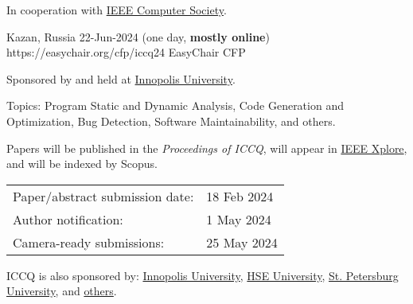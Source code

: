 \documentclass{../cfp}
\begin{document}
\PrintLogo{}



In cooperation
with
\href{https://conferences.ieee.org/conferences_events/conferences/conferencedetails/53703}{IEEE Computer Society}.

\vspace{6pt}

\PrintAddress
  {Kazan, Russia}
  {22-Jun-2024 (one day, \textbf{mostly online})}
  {https://easychair.org/cfp/iccq24}
  {EasyChair CFP}

\vspace{12pt}
%
%
\vspace{12pt}

Sponsored by and held at \href{https://innopolis.university/}{Innopolis University}.

Topics: Program Static and Dynamic Analysis,
Code Generation and Optimization,
Bug Detection, Software Maintainability, and others.

Papers will be published in the \textit{Proceedings of ICCQ},
will appear in \href{https://ieeexplore.ieee.org/Xplore/home.jsp}{IEEE Xplore\textsuperscript{\textregistered}},
and will be indexed by Scopus.

\begin{tabular}{@{}ll}
Paper/abstract submission date: & 18 Feb 2024 \\
Author notification: & 1 May 2024 \\
Camera-ready submissions: & 25 May 2024
\end{tabular}

\vspace{6pt}
ICCQ is also sponsored by:
\href{https://innopolis.university/}{Innopolis University},
\href{https://www.hse.ru/en/}{HSE University},
\href{https://english.spbu.ru/}{St. Petersburg University},
and \href{https://www.iccq.ru/2022.html#partners}{others}.
\end{document}
